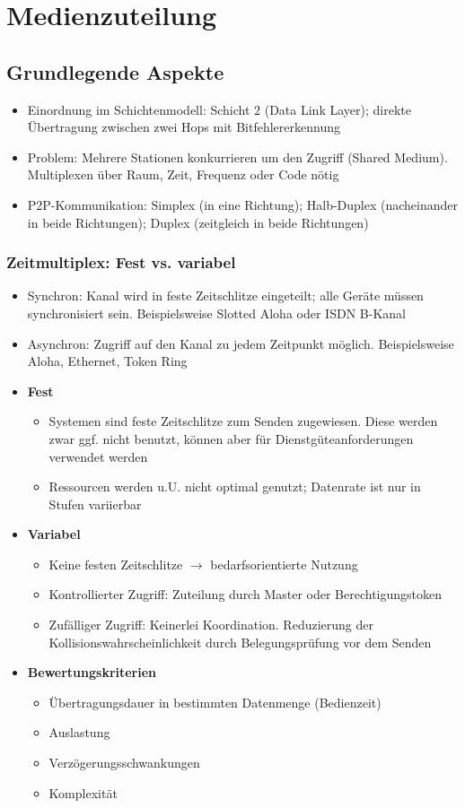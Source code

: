 \section{Medienzuteilung}

\subsection{Grundlegende Aspekte}
\begin{itemize}
	\item Einordnung im Schichtenmodell: Schicht 2 (Data Link Layer); direkte Übertragung zwischen zwei Hops mit Bitfehlererkennung
	\item Problem: Mehrere Stationen konkurrieren um den Zugriff (Shared Medium). Multiplexen über Raum, Zeit, Frequenz oder Code nötig
	\item P2P-Kommunikation: Simplex (in eine Richtung); Halb-Duplex (nacheinander in beide Richtungen); Duplex (zeitgleich in beide Richtungen)
\end{itemize}

\subsubsection{Zeitmultiplex: Fest vs. variabel}
\begin{itemize}
	\item Synchron: Kanal wird in feste Zeitschlitze eingeteilt; alle Geräte müssen synchronisiert sein. Beispielsweise Slotted Aloha oder ISDN B-Kanal
	\item Asynchron: Zugriff auf den Kanal zu jedem Zeitpunkt möglich. Beispielsweise Aloha, Ethernet, Token Ring
	\item \textbf{Fest}
	\begin{itemize}
		\item Systemen sind feste Zeitschlitze zum Senden zugewiesen. Diese werden zwar ggf. nicht benutzt, können aber für Dienstgüteanforderungen verwendet werden
		\item Ressourcen werden u.U. nicht optimal genutzt; Datenrate ist nur in Stufen variierbar
	\end{itemize}
	\item \textbf{Variabel}
	\begin{itemize}
		\item Keine festen Zeitschlitze \(\rightarrow\) bedarfsorientierte Nutzung
		\item Kontrollierter Zugriff: Zuteilung durch Master oder Berechtigungstoken
		\item Zufälliger Zugriff: Keinerlei Koordination. Reduzierung der Kollisionswahrscheinlichkeit durch Belegungsprüfung vor dem Senden
	\end{itemize}
	\item \textbf{Bewertungskriterien}
	\begin{itemize}
		\item Übertragungsdauer in bestimmten Datenmenge (Bedienzeit)
		\item Auslastung
		\item Verzögerungsschwankungen
		\item Komplexität
	\end{itemize}
\end{itemize}

